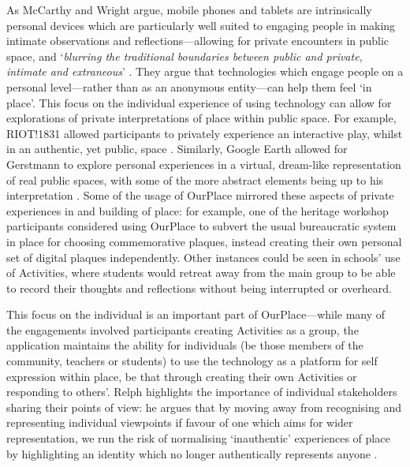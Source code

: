 As McCarthy and Wright argue, mobile phones and tablets are intrinsically personal devices which are particularly well suited to engaging people in making intimate observations and reflections---allowing for private encounters in public space, and `\textit{blurring the traditional boundaries between public and private, intimate and extraneous}' \citep{McCarthy2005}. They argue that technologies which engage people on a personal level---rather than as an anonymous entity---can help them feel `in place'. This focus on the individual experience of using technology can allow for explorations of private interpretations of place within public space. For example, RIOT!1831 allowed participants to privately experience an interactive play, whilst in an authentic, yet public, space \citep{Blythe2006}. Similarly, Google Earth allowed for Gerstmann to explore personal experiences in a virtual, dream-like representation of real public spaces, with some of the more abstract elements being up to his interpretation \citep{Gerstmann2016}. Some of the usage of OurPlace mirrored these aspects of private experiences in and building of place: for example, one of the heritage workshop participants considered using OurPlace to subvert the usual bureaucratic system in place for choosing commemorative plaques, instead creating their own personal set of digital plaques independently. Other instances could be seen in schools' use of Activities, where students would retreat away from the main group to be able to record their thoughts and reflections without being interrupted or overheard. 

This focus on the individual is an important part of OurPlace---while many of the engagements involved participants creating Activities as a group, the application maintains the ability for individuals (be those members of the community, teachers or students) to use the technology as a platform for self expression within place, be that through creating their own Activities or responding to others'. Relph highlights the importance of individual stakeholders sharing their points of view: he argues that by moving away from recognising and representing individual viewpoints if favour of one which aims for wider representation, we run the risk of normalising `inauthentic' experiences of place by highlighting an identity which no longer authentically represents anyone \citep{Relph1976}. 

